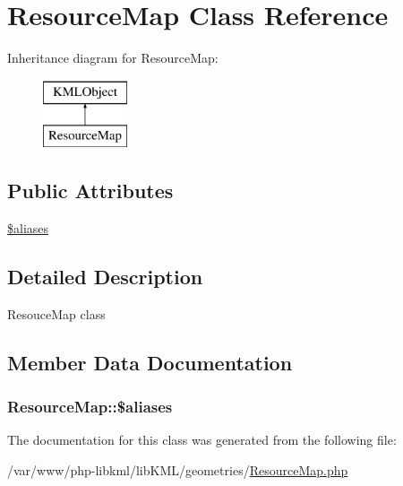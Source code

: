 \hypertarget{classResourceMap}{
\section{ResourceMap Class Reference}
\label{dd/d19/classResourceMap}
}
Inheritance diagram for ResourceMap:\begin{figure}[H]
\begin{center}
\leavevmode
\includegraphics[height=2.000000cm]{dd/d19/classResourceMap}
\end{center}
\end{figure}
\subsection*{Public Attributes}
\begin{DoxyCompactItemize}
\item 
\hyperlink{classResourceMap_afdbd7ffc3d292e0be9c264d41edaf166}{\$aliases}
\end{DoxyCompactItemize}


\subsection{Detailed Description}
ResouceMap class 

\subsection{Member Data Documentation}
\hypertarget{classResourceMap_afdbd7ffc3d292e0be9c264d41edaf166}{
\subsubsection[{\$aliases}]{\setlength{\rightskip}{0pt plus 5cm}ResourceMap::\$aliases}}
\label{dd/d19/classResourceMap_afdbd7ffc3d292e0be9c264d41edaf166}


The documentation for this class was generated from the following file:\begin{DoxyCompactItemize}
\item 
/var/www/php-\/libkml/libKML/geometries/\hyperlink{ResourceMap_8php}{ResourceMap.php}\end{DoxyCompactItemize}
